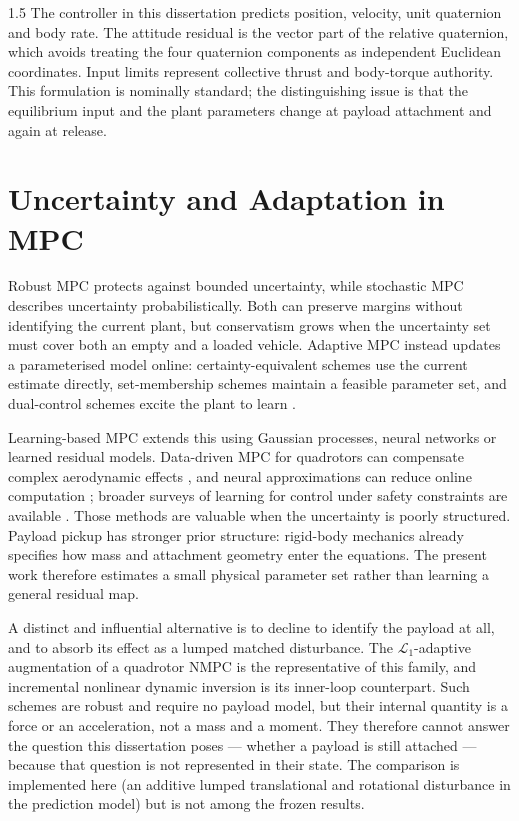 \begin{spacing}{1.5}
The controller in this dissertation predicts position, velocity, unit quaternion
and body rate. The attitude residual is the vector part of the relative
quaternion, which avoids treating the four quaternion components as independent
Euclidean coordinates. Input limits represent collective thrust and body-torque
authority. This formulation is nominally standard; the distinguishing issue is
that the equilibrium input and the plant parameters change at payload attachment
and again at release.

\section{Uncertainty and Adaptation in MPC}

Robust MPC protects against bounded uncertainty, while stochastic MPC describes
uncertainty probabilistically. Both can preserve margins without identifying the
current plant, but conservatism grows when the uncertainty set must cover both an
empty and a loaded vehicle. Adaptive MPC instead updates a parameterised model
online: certainty-equivalent schemes use the current estimate directly,
set-membership schemes maintain a feasible parameter set, and dual-control
schemes excite the plant to learn \cite{aswani2013learning,hewing2020learning}.

Learning-based MPC extends this using Gaussian processes, neural networks or
learned residual models. Data-driven MPC for quadrotors can compensate complex
aerodynamic effects \cite{torrente2021}, and neural
approximations can reduce online computation \cite{salzmann2023neural}; broader
surveys of learning for control under safety constraints are available
\cite{brunke}. Those methods are valuable when the uncertainty is poorly
structured. Payload pickup has stronger prior structure: rigid-body mechanics
already specifies how mass and attachment geometry enter the equations. The
present work therefore estimates a small physical parameter set rather than
learning a general residual map.

A distinct and influential alternative is to decline to identify the payload at
all, and to absorb its effect as a lumped matched disturbance. The
$\mathcal{L}_1$-adaptive augmentation of a quadrotor NMPC \cite{hanover2021} is
the representative of this family, and incremental nonlinear dynamic inversion
\cite{smeur} is its inner-loop counterpart. Such schemes are robust and require
no payload model, but their internal quantity is a force or an acceleration, not
a mass and a moment. They therefore cannot answer the question this dissertation
poses --- whether a payload is still attached --- because that question is not
represented in their state. The comparison is implemented here (an additive
lumped translational and rotational disturbance in the prediction model) but is
not among the frozen results.


\end{spacing}
